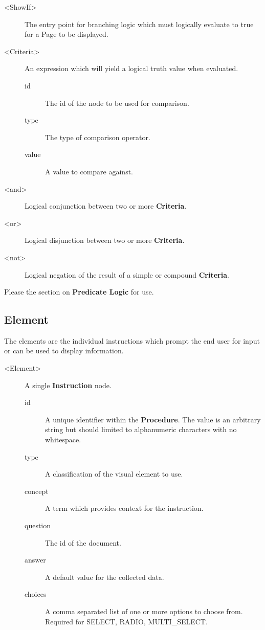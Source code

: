 \documentclass[a4paper,10pt]{article}
\begin{document}
\begin{description}
 \item[\textless ShowIf\textgreater] The entry point for branching logic which 
 must logically evaluate to true for a Page to be displayed.
 \item[\textless Criteria\textgreater] An expression which will yield a logical 
 truth value when evaluated.
  \begin{description}
   \item[id] The id of the node to be used for comparison.
   \item[type] The type of comparison operator.
   \item[value] A value to compare against.
  \end{description}  
 \item[\textless and\textgreater] Logical conjunction between two or more 
 \textbf{Criteria}.
 \item[\textless or\textgreater] Logical disjunction between two or more 
 \textbf{Criteria}.
 \item[\textless not\textgreater] Logical negation of the result of a simple or 
 compound \textbf{Criteria}.
\end{description}

Please the section on \textbf{Predicate Logic} for use.

\subsection{Element}
The elements are the individual instructions which prompt the end user for input
or can be used to display information.

\begin{description} 
 \item [\textless Element\textgreater] A single \textbf{Instruction} node.
  \begin{description}
   \item[id] A unique identifier within the \textbf{Procedure}. The value is an
   arbitrary string but should limited to alphanumeric characters with no
   whitespace. 
   \item[type] A classification of the visual element to use.
   \item[concept] A term which provides context for the instruction.
   \item[question] The id of the document.
   \item[answer] A default value for the collected data.
   \item[choices] A  comma separated list of one or more options to choose from.
   Required for SELECT, RADIO, MULTI\_SELECT.
  \end{description}  
\end{description}
\end{document}
